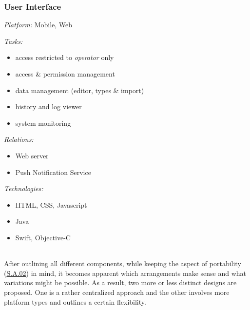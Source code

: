\documentclass[12pt,english,a4paper,titlepage,cleardoublepage=empty,dottedtoc]{report}
\providecommand{\tightlist}{%
  \setlength{\itemsep}{0pt}\setlength{\parskip}{0pt}}
\begin{document}
\subsubsection*{User Interface}\label{user-interface}

\emph{Platform:} Mobile, Web

\emph{Tasks:}

\begin{itemize}
\tightlist
\item
  access restricted to \emph{operator} only
\item
  access \& permission management
\item
  data management (editor, types \& import)
\item
  history and log viewer
\item
  system monitoring
\end{itemize}

\emph{Relations:}

\begin{itemize}
\tightlist
\item
  Web server
\item
  Push Notification Service
\end{itemize}

\emph{Technologies:}

\begin{itemize}
\tightlist
\item
  HTML, CSS, Javascript
\item
  Java
\item
  Swift, Objective-C
\end{itemize}

~\\
After outlining all different components, while keeping the aspect of
portability (\protect\hyperlink{sa02}{S.A.02}) in mind, it becomes
apparent which arrangements make sense and what variations might be
possible. As a result, two more or less distinct designs are proposed.
One is a rather centralized approach and the other involves more
platform types and outlines a certain flexibility.
\end{document}
